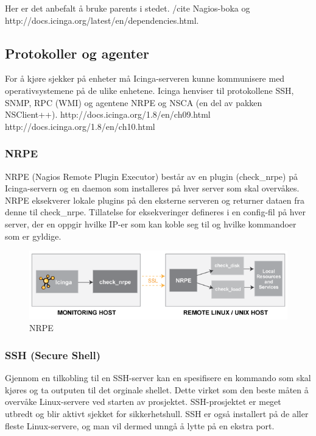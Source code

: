 Her er det anbefalt å bruke parents i stedet. /cite Nagios-boka og http://docs.icinga.org/latest/en/dependencies.html.

\subsection{Protokoller og agenter }
For å kjøre sjekker på enheter må Icinga-serveren kunne kommunisere med operativsystemene på de ulike enhetene. Icinga henviser til protokollene SSH, SNMP, RPC (WMI) og agentene NRPE og NSCA (en del av pakken NSClient++). http://docs.icinga.org/1.8/en/ch09.html http://docs.icinga.org/1.8/en/ch10.html 

\subsubsection{NRPE}
NRPE (Nagios Remote Plugin Executor) består av en plugin (check\_nrpe) på Icinga-servern og en daemon som installeres på hver server som skal overvåkes. NRPE eksekverer lokale plugins på den eksterne serveren og returner dataen fra denne til check\_nrpe. Tillatelse for eksekveringer defineres i en config-fil på hver server, der en oppgir hvilke IP-er som kan koble seg til og hvilke kommandoer som er gyldige. 

\begin{center}
\begin{figure}
    \includegraphics{img/nrpe.png}
    \caption{NRPE}
    \label{nrpe}
\end{figure}
\end{center}


\subsubsection{SSH (Secure Shell)}

Gjennom en tilkobling til en SSH-server kan en spesifisere en kommando som skal kjøres og ta outputen til det orginale shellet. Dette virket som den beste måten å overvåke Linux-servere ved starten av prosjektet. SSH-prosjektet er meget utbredt og blir aktivt sjekket for sikkerhetshull. SSH er også installert på de aller fleste Linux-servere, og man vil dermed unngå å lytte på en ekstra port. 


